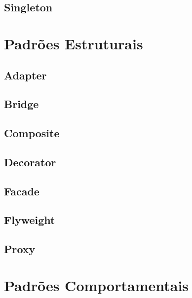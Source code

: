 \documentclass[
	12pt,				%
	openright,			%
	twoside,			%
	a4paper,			%
	english,			%
	french,				%
	spanish,			%
	brazil				%
	]{abntex2}
\begin{document}
\section{Singleton}

\chapter{Padrões Estruturais}

%
%
%
%
%
%
%
\section{Adapter}
\section{Bridge}
\section{Composite}
\section{Decorator}
\section{Facade}
\section{Flyweight}
\section{Proxy}

\chapter{Padrões Comportamentais}
\end{document}
